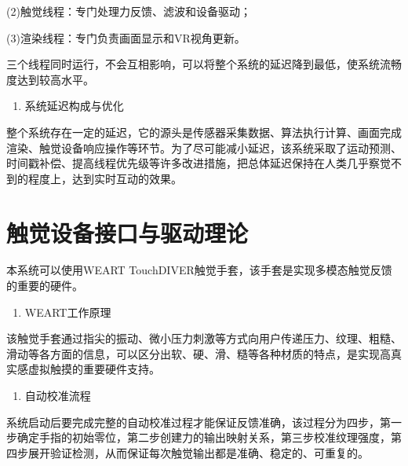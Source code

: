 (2)触觉线程：专门处理力反馈、滤波和设备驱动；

(3)渲染线程：专门负责画面显示和VR视角更新。

三个线程同时运行，不会互相影响，可以将整个系统的延迟降到最低，使系统流畅度达到较高水平。

\begin{enumerate}
\def\labelenumi{\arabic{enumi}.}
\setcounter{enumi}{2}
\item
  系统延迟构成与优化
\end{enumerate}

整个系统存在一定的延迟，它的源头是传感器采集数据、算法执行计算、画面完成渲染、触觉设备响应操作等环节。为了尽可能减小延迟，该系统采取了运动预测、时间戳补偿、提高线程优先级等许多改进措施，把总体延迟保持在人类几乎察觉不到的程度上，达到实时互动的效果。

\section{触觉设备接口与驱动理论}

本系统可以使用WEART
TouchDIVER触觉手套，该手套是实现多模态触觉反馈的重要的硬件。

\begin{enumerate}
\def\labelenumi{\arabic{enumi}.}
\item
  WEART工作原理
\end{enumerate}

该触觉手套通过指尖的振动、微小压力刺激等方式向用户传递压力、纹理、粗糙、滑动等各方面的信息，可以区分出软、硬、滑、糙等各种材质的特点，是实现高真实感虚拟触摸的重要硬件支持。

\begin{enumerate}
\def\labelenumi{\arabic{enumi}.}
\setcounter{enumi}{1}
\item
  自动校准流程
\end{enumerate}

系统启动后要完成完整的自动校准过程才能保证反馈准确，该过程分为四步，第一步确定手指的初始零位，第二步创建力的输出映射关系，第三步校准纹理强度，第四步展开验证检测，从而保证每次触觉输出都是准确、稳定的、可重复的。
